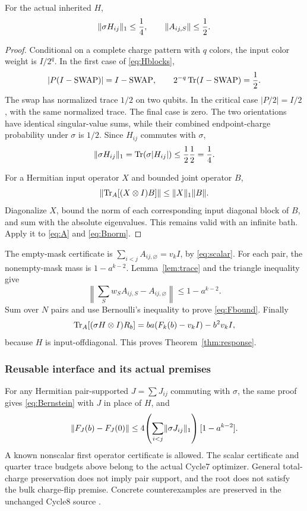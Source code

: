 \begin{lemma}\label{lem:trace}
For the actual inherited \(H\),
\[
 \lVert \sigma H_{ij}\rVert_1\le\frac14,\qquad
 \lVert A_{ij,S}\rVert\le\frac12.
\]
\end{lemma}
\begin{proof}
Conditional on a complete charge pattern with \(q\) colors, the input
color weight is \(I/2^q\). In the first case of \eqref{eq:Hblocks},
\[
 |P(I-\operatorname{SWAP})|=I-\operatorname{SWAP},\qquad
 2^{-q}\operatorname{Tr}(I-\operatorname{SWAP})=\frac12.
\]
The swap has normalized trace \(1/2\) on two qubits. In the critical
case \(|P/2|=I/2\), with the same normalized trace. The final case is
zero. The two orientations have identical singular-value sums, while
their combined endpoint-charge probability under \(\sigma\) is \(1/2\).
Since \(H_{ij}\) commutes with \(\sigma\),
\[
 \lVert \sigma H_{ij}\rVert_1
 =\operatorname{Tr}(\sigma|H_{ij}|)\le\frac12\frac12=\frac14.
\]

For a Hermitian input operator \(X\) and bounded joint operator \(B\),
\[
 \lVert \operatorname{Tr}_A[(X\otimes I)B]\rVert\le\lVert X\rVert_1\lVert B\rVert.
\]
Diagonalize \(X\), bound the norm of each corresponding input diagonal
block of \(B\), and sum with the absolute eigenvalues. This remains valid
with an infinite bath. Apply it to \eqref{eq:A} and \eqref{eq:Bnorm}.
\end{proof}

The empty-mask certificate is
\(\sum_{i<j}A_{ij,\varnothing}=v_kI\), by \eqref{eq:scalar}.
For each pair, the nonempty-mask mass is \(1-a^{k-2}\).
Lemma~\ref{lem:trace} and the triangle inequality give
\[
 \left\|\sum_Sw_S A_{ij,S}-A_{ij,\varnothing}\right\|
 \le1-a^{k-2}.
\]
Sum over \(N\) pairs and use Bernoulli's inequality to prove
\eqref{eq:Fbound}. Finally
\[
 \operatorname{Tr}_A[(\sigma H\otimes I)R_b]
 =ba(F_k(b)-v_kI)-b^2v_kI,
\]
because \(H\) is input-offdiagonal. This proves
Theorem~\ref{thm:response}.

\subsubsection{Reusable interface and its actual premises}

For any Hermitian pair-supported \(J=\sum J_{ij}\) commuting with
\(\sigma\), the same proof gives \eqref{eq:Bernstein} with \(J\) in place
of \(H\), and
\[
 \lVert F_J(b)-F_J(0)\rVert
 \le4\!\left(\sum_{i<j}\lVert \sigma J_{ij}\rVert_1\right)
      [1-a^{k-2}].
\]
A known nonscalar first operator certificate is allowed. The scalar
certificate and quarter trace budgets above belong to the actual Cycle7
optimizer. General total-charge preservation does not imply pair support,
and the root does not satisfy the bulk charge-flip premise. Concrete
counterexamples are preserved in the unchanged Cycle8 source \cite{Cycle8}.

